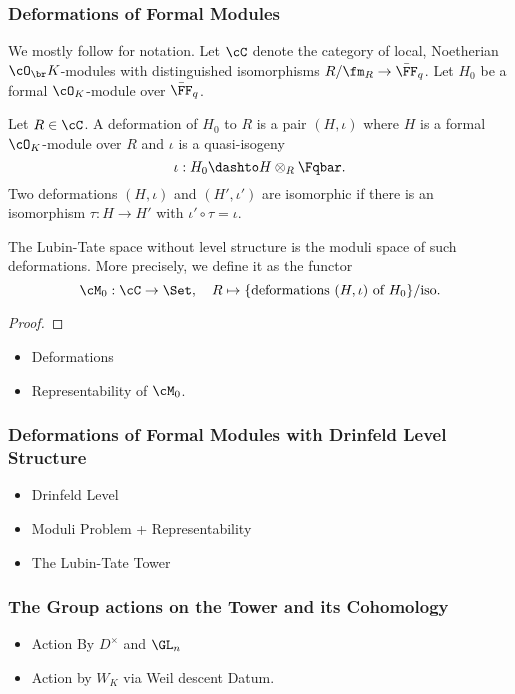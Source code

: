 \subsubsection{Deformations of Formal Modules} %
\label{subsub:Deformations of Formal Modules}
We mostly follow \cite[Chapter 2]{Strauch2008DefSp} for notation. Let $\cC$
denote the category of local, Noetherian $\cO_\br K$-modules with distinguished
isomorphisms $R/\fm_R \to \bar \FF_q$. Let $H_0$ be a formal $\cO_K$-module 
over $\bar \FF_q$. 
\begin{defi}[Deformation]
  Let $R \in \cC$. A deformation of $H_0$ to $R$ is a pair $(H, \iota)$ where
  $H$ is a formal $\cO_K$-module over $R$ and $\iota$ is a quasi-isogeny
  \begin{equation*}
    \iota: H_0 \dashto H \otimes_R \Fqbar.
  \end{equation*}
  Two deformations $(H, \iota)$ and $(H', \iota')$ are isomorphic if there is
  an isomorphism $\tau: H \to H'$ with $\iota' \circ \tau = \iota$. 
\end{defi}
The Lubin-Tate space without level structure is the moduli space of such deformations.
More precisely, we define it as the functor
\begin{equation*}
  \cM_0: \cC \to \Set, \quad R \mapsto \{\text{deformations } (H, \iota) \text{
  of $H_0$}\}/\text{iso}.
\end{equation*}

\begin{thm}[Representability of $\cM_0$]
  
\begin{proof}
\end{proof}
\end{thm}



\begin{itemize}
  \item Deformations
  \item Representability of $\cM_0$.
\end{itemize}

\subsubsection{Deformations of Formal Modules with Drinfeld Level Structure} %
\label{subsub:Deformations of Formal Modules with Drinfeld Level Structure}
\begin{itemize}
  \item Drinfeld Level
  \item Moduli Problem + Representability
  \item The Lubin-Tate Tower
\end{itemize}

\subsubsection{The Group actions on the Tower and its Cohomology} %
\label{subsub:The Group actions on the Tower}
\begin{itemize}
  \item Action By $D^\times$ and $\GL_n$
  \item Action by $W_K$ via Weil descent Datum.
\end{itemize}
